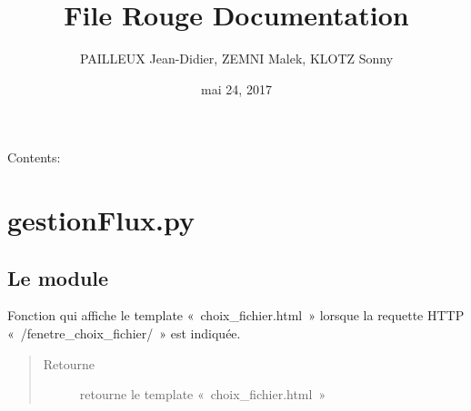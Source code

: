 \documentclass[letterpaper,10pt,french]{sphinxmanual}
\title{File Rouge Documentation}
\date{mai 24, 2017}
\author{PAILLEUX Jean-Didier, ZEMNI Malek, KLOTZ Sonny}
\begin{document}
\maketitle
\sphinxtableofcontents
{}\label{\detokenize{index::doc}}


Contents:


\chapter{gestionFlux.py}
\label{\detokenize{gestionFlux:bienvenue-sur-la-documentation-du-projet-file-rouge}}\label{\detokenize{gestionFlux:gestionflux-py}}\label{\detokenize{gestionFlux::doc}}\label{\detokenize{gestionFlux:module-interface_web.gestionFlux}}

\section{Le module }
\label{\detokenize{gestionFlux:le-module-gestion-des-flux}}

\begin{fulllineitems}
\label{\detokenize{gestionFlux:interface_web.gestionFlux.fenetre_choix_fichier}}
Fonction qui affiche le template « choix\_fichier.html » lorsque la requette HTTP « /fenetre\_choix\_fichier/ » est indiquée.
\begin{quote}\begin{description}
\item[{Retourne}] \leavevmode
retourne le template « choix\_fichier.html »

\end{description}\end{quote}

\end{fulllineitems}

\end{document}
